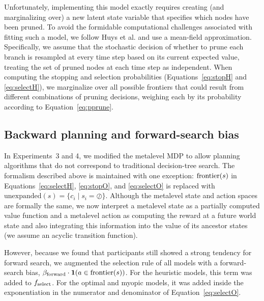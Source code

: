 Unfortunately, implementing this model exactly requires creating (and marginalizing over) a new latent state variable that specifies which nodes have been pruned. To avoid the formidable computational challenges associated with fitting such a model, we follow Huys et al. \citep{huys2012bonsai,huys2015interplay} and use a mean-field approximation. Specifically, we assume that the stochastic decision of whether to prune each branch is resampled at every time step based on its current expected value, treating the set of pruned nodes at each time step as independent. When computing the stopping and selection probabilities (Equations~\ref{eq:stopH} and \ref{eq:selectH}), we marginalize over all possible frontiers that could result from different combinations of pruning decisions, weighing each by its probability according to Equation~\ref{eq:pprune}.

\subsection{Backward planning and forward-search bias}\label{sec:planning-backward}
In Experiments~3 and 4, we modified the metalevel MDP to allow planning algorithms that do not correspond to traditional decision-tree search. The formalism described above is maintained with one exception: $\mathrm{frontier}(s)$ in Equations~\ref{eq:selectH}, \ref{eq:stopO}, and \ref{eq:selectO} is replaced with $\mathrm{unexpanded}(s) = \{c_i \mid s_i = \oslash \}$. Although the metalevel state and action spaces are formally the same, we now interpret a metalevel state as a partially computed value function and a metalevel action as computing the reward at a future world state and also integrating this information into the value of its ancestor states (we assume an acyclic transition function).

However, because we found that participants still showed a strong tendency for forward search, we augmented the selection rule of all models with a forward-search bias, $\beta_{\mathrm{forward}} \cdot \mathbf{1}(a \in \mathrm{frontier}(s))$. For the heuristic models, this term was added to $f_{\mathrm{select}}$. For the optimal and myopic models, it was added inside the exponentiation in the numerator and denominator of Equation~\ref{eq:selectO}.


